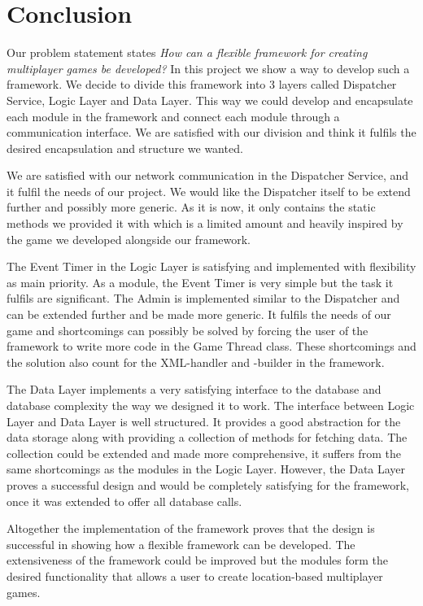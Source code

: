 \section{Conclusion}
Our problem statement states \textit{How can a flexible framework for creating multiplayer games be developed?} In this project we show a way to develop such a framework. We decide to divide this framework into 3 layers called Dispatcher Service, Logic Layer and Data Layer. This way we could develop and encapsulate each module in the framework and connect each module through a communication interface. We are satisfied with our division and think it fulfils the desired encapsulation and structure we wanted. 

We are satisfied with our network communication in the Dispatcher Service, and it fulfil the needs of our project. We would like the Dispatcher itself to be extend further and possibly more generic. As it is now, it only contains the static methods we provided it with which is a limited amount and heavily inspired by the game we developed alongside our framework. 

The Event Timer in the Logic Layer is satisfying and implemented with flexibility as main priority. As a module, the Event Timer is very simple but the task it fulfils are significant. The Admin is implemented similar to the Dispatcher and can be extended further and be made more generic. It fulfils the needs of our game and shortcomings can possibly be solved by forcing the user of the framework to write more code in the Game Thread class. These shortcomings and the solution also count for the XML-handler and -builder in the framework.

The Data Layer implements a very satisfying interface to the database and database complexity the way we designed it to work. The interface between Logic Layer and Data Layer is well structured. It provides a good abstraction for the data storage along with providing a collection of methods for fetching data. The collection could be extended and made more comprehensive, it suffers from the same shortcomings as the modules in the Logic Layer. However, the Data Layer proves a successful design and would be completely satisfying for the framework, once it was extended to offer all database calls. 

Altogether the implementation of the framework proves that the design is successful in showing how a flexible framework can be developed. The extensiveness of the framework could be improved but the modules form the desired functionality that allows a user to create location-based multiplayer games. 
